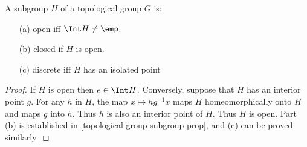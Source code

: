 \begin{proposition}
A subgroup $H$ of a topological group $G$ is:
\begin{itemize}
\item[(a)] open iff $\Int H\neq\emp$.
\item[(b)] closed if $H$ is open.
\item[(c)] discrete iff $H$ has an isolated point
\end{itemize}
\end{proposition}
\begin{proof}
If $H$ is open then $e\in\Int H$. Conversely, suppose that $H$ has an interior point $g$. For any $h$ in $H$, the map $x\mapsto hg^{-1}x$ maps $H$ homeomorphically onto $H$ and maps $g$ into $h$. Thus $h$ is also an interior point of $H$. Thus $H$ is open. Part (b) is established in \cref{topological group subgroup prop}, and (c) can be proved similarly.
\end{proof}
